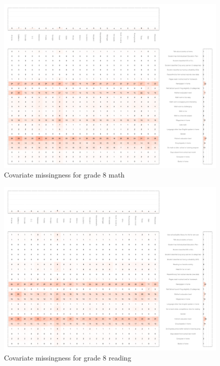 \begin{figure}[h]
\begin{center}
\includegraphics[width=\textwidth]{../Figures2009/g8math-missing.pdf}
\caption{Covariate missingness for grade 8 math}
\label{fig:g8math:missing}
\end{center}
\end{figure}

\begin{figure}[h]
\begin{center}
\includegraphics[width=\textwidth]{../Figures2009/g8read-missing.pdf}
\caption{Covariate missingness for grade 8 reading}
\label{fig:g8reading:missing}
\end{center}
\end{figure}


